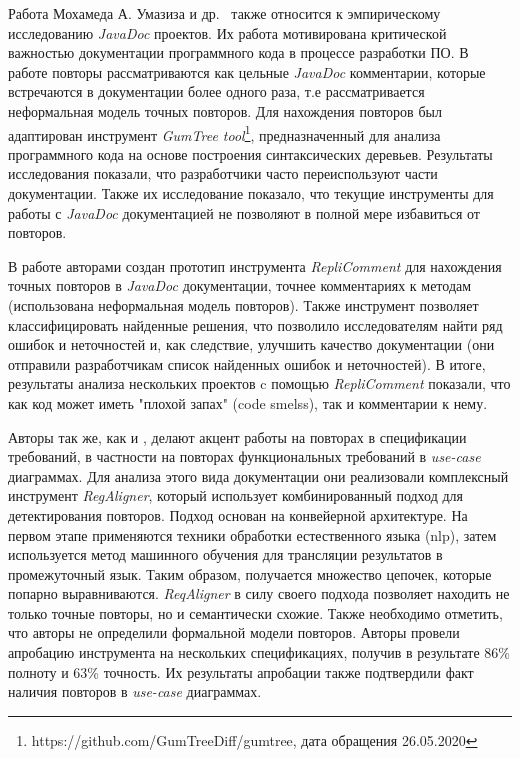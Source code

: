 Работа Мохамеда А. Умазиза и др.~\cite{oumaziz2017documentation} также относится к эмпирическому исследованию \emph{JavaDoc} проектов. 
Их работа мотивирована критической важностью документации программного кода в процессе разработки ПО.
В работе повторы рассматриваются как цельные \emph{JavaDoc} комментарии, которые встречаются в документации более одного раза, т.е рассматривается неформальная модель точных повторов.
Для нахождения повторов был адаптирован инструмент \emph{GumTree tool}\footnote{https://github.com/GumTreeDiff/gumtree, дата обращения 26.05.2020},  предназначенный для анализа программного кода на основе построения синтаксических деревьев.
Результаты исследования показали, что  разработчики часто  переиспользуют части документации.
Также их исследование показало, что текущие инструменты для работы с \emph{JavaDoc} документацией не позволяют в полной мере избавиться от повторов.


В работе \cite{blasi2018replicomment} авторами создан прототип инструмента \emph{RepliComment} для нахождения точных повторов в \emph{JavaDoc} документации, точнее комментариях к методам (использована неформальная модель повторов).
Также инструмент позволяет классифицировать найденные решения, что позволило исследователям найти ряд ошибок и неточностей и, как следствие, улучшить качество документации (они отправили разработчикам список найденных ошибок и неточностей).
В итоге,  результаты анализа нескольких проектов c помощью \emph{RepliComment} показали, что как код может иметь "плохой запах" (code smelss), так и комментарии к нему. 

Авторы \cite{rago2016identifying} так же, как и \cite{juergens2010can}, делают акцент работы на повторах в спецификации требований, в частности на повторах функциональных требований в \emph{use-case} диаграммах.
Для анализа этого вида документации они реализовали комплексный инструмент  \emph{RegAligner}, который использует комбинированный подход для детектирования повторов.
Подход основан на конвейерной архитектуре. 
На первом этапе применяются техники обработки естественного языка (nlp), затем используется метод машинного обучения для трансляции результатов в промежуточный язык. Таким образом, получается множество цепочек, которые попарно выравниваются.
\emph{ReqAligner} в силу своего подхода позволяет находить не только точные повторы, но и семантически схожие.
Также необходимо отметить, что авторы не определили формальной модели повторов.
Авторы провели апробацию инструмента на нескольких спецификациях, получив в результате 86\% полноту и 63\% точность.
Их результаты апробации также подтвердили факт наличия повторов в \emph{use-case} диаграммах.


